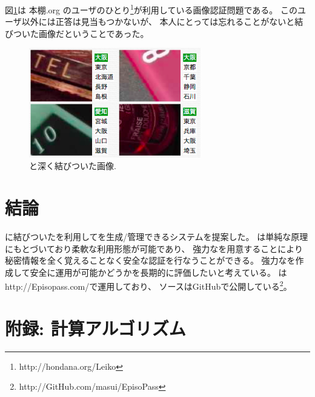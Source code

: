 \documentclass[twoside]{wiss}
\begin{document}
図\ref{leiko}は
本棚.org\cite{hondana}\cite{hondanaorg}
のユーザのひとり\footnote{
  \textsf{http://hondana.org/Leiko}
}が利用している画像認証問題である。
このユーザ以外には正答は見当もつかないが、
本人にとっては忘れることがない{\EM}と結びついた画像だということであった。

\begin{figure}[H]
\centerline{\includegraphics[width=75mm,bb=0 0 335 213]{figures/4084ac59b42d183d7124481477e84999.png}}
\caption{{\EM}と深く結びついた画像.}
\label{leiko}
\end{figure}

%
%

%
%

\section{結論}

{\EM}に結びついた{\SQ}を利用して{\PW}を生成/管理できるシステム{\EP}を提案した。
{\EP}は単純な原理にもとづいており柔軟な利用形態が可能であり、
強力な{\SQ}を用意することにより
秘密情報を全く覚えることなく安全な認証を行なうことができる。
%
強力な{\SQ}を作成して安全に運用が可能かどうかを長期的に評価したいと考えている。
%
%
{\EP}は\textsf{http://Episopass.com/}で運用しており、
ソースはGitHubで公開している\footnote{
  \textsf{http://GitHub.com/masui/EpisoPass}
}。

{\scriptsize


}

\section*{附録: {\PW}計算アルゴリズム}
\end{document}
